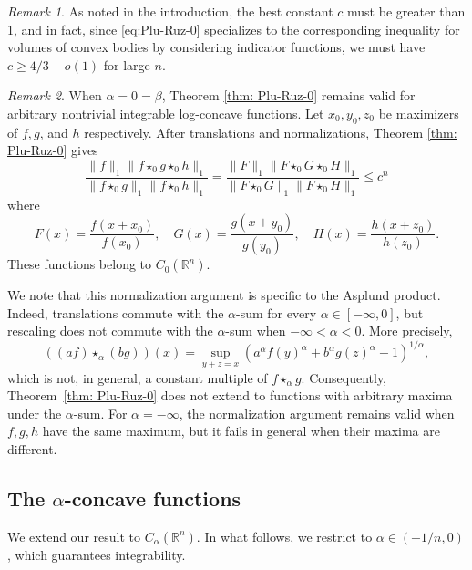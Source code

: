 \documentclass[11pt]{amsart}
\newcommand{\R}{{\mathbb R}}
\theoremstyle{plain}
\theoremstyle{definition}
\theoremstyle{remark}
\newtheorem{remark}{Remark}
\begin{document}
\begin{remark}
    As noted in the introduction, the best constant $c$ must be greater than 1, and in fact, since \eqref{eq:Plu-Ruz-0} specializes to the corresponding inequality for volumes of convex bodies by considering indicator functions, we must have $c\ge 4/3 -o(1)$ for large $n$.
\end{remark}

\begin{remark}
    When $\alpha = 0 = \beta$, Theorem \ref{thm: Plu-Ruz-0} remains valid for arbitrary nontrivial integrable log-concave functions. Let $x_0,y_0,z_0$ be maximizers of $f,g$, and $h$ respectively.
    After translations and normalizations, Theorem \ref{thm: Plu-Ruz-0} gives
    \[
        \frac{\|f\|_1 \|f\star_0 g \star_0 h\|_1}{\|f\star_0 g \|_1 \|f\star_0  h\|_1} =
        \frac{\|F\|_1 \|F\star_0 G \star_0 H\|_1}{\|F\star_0 G \|_1 \|F\star_0  H\|_1} \leq c^n
    \]
    where
    $$
    F(x)=\frac{f\left(x+x_0\right)}{f\left(x_0\right)}, \quad G(x)=\frac{g\left(x+y_0\right)}{g\left(y_0\right)}, \quad H(x)=\frac{h\left(x+z_0\right)}{h\left(z_0\right)} .
    $$
    These functions belong to $C_0\left(\mathbb{R}^n\right)$.

    We note that this normalization argument is specific to the Asplund product.
Indeed, translations commute with the $\alpha$-sum for every
$\alpha\in[-\infty,0]$, but rescaling does not commute with
the $\alpha$-sum when $-\infty<\alpha<0$. More precisely,
\[
((af)\star_\alpha(bg))(x)
=
\sup_{y+z=x}
\left(a^\alpha f(y)^\alpha+b^\alpha g(z)^\alpha-1\right)^{1/\alpha},
\]
which is not, in general, a constant multiple of $f\star_\alpha g$.
Consequently, Theorem~\ref{thm: Plu-Ruz-0} does not extend to
functions with arbitrary maxima under the $\alpha$-sum.
For $\alpha=-\infty$, the normalization argument remains valid when
$f,g,h$ have the same maximum, but it fails in general when
their maxima are different.
\end{remark}

\subsection{The \texorpdfstring{$\alpha$}{α}-concave functions} \label{sec: alpha-concave-plu}
We extend our result to $C_\alpha(\R^n)$. In what follows, we restrict to $\alpha\in(-1/n,0)$, which guarantees integrability.
\end{document}
